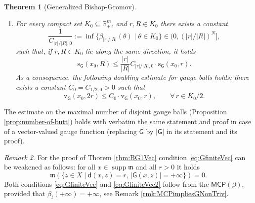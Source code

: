 \documentclass[11pt,a4paper]{article}
\theoremstyle{plain}
\newtheorem{theorem}{Theorem}[section]
\theoremstyle{definition}
\theoremstyle{remark}
\newtheorem{remark}[theorem]{Remark}
\numberwithin{equation}{section}
\newcommand{\R}{\mathbb{R}} %
\DeclareMathOperator{\supp}{\mathrm{supp}}
\newcommand{\MCP}{\mathsf{MCP}}
\newcommand{\sfs}{\mathsf{s}}
\newcommand{\rv}{\mathrm{v}}
\newcommand{\rs}{\mathrm{s}}
\newcommand{\di}{\mathrm{d}}
\newcommand{\mm}{\mathfrak m}
\newcommand{\sfd}{\mathsf d}
\newcommand{\sfG}{\mathsf G}
\begin{document}
\begin{theorem}[Generalized Bishop-Gromov]
\begin{enumerate}[label = (\roman*)]
\begin{align}
\frac{\rs_{\sfG}(x_{0}, r)}{ \rs_{\sfG}(x_{0}, R)} \geq \frac{|R|}{|r|} \frac{\sfs(r)}{ \sfs(R)}. \label{eq:BisGr2VecA} 
\end{align}
Furthermore, it holds:
 \begin{equation} \label{eq:BisGr2VecV}
 \frac{\rv_{\sfG}(x_{0}, r)}{ \int_{0}^{|r|}   \sfs(t\theta)/t \, \di t} \geq \frac{\rv_{\sfG}(x_{0}, R)}{ \int_0^{|R|} \sfs(t\theta)/t \, \di t};
 \end{equation}

\item  \label{i:BG6Vec} For every compact set $K_0\subseteq \R^m_+$, and $r,R\in K_0$ there exists a constant 
\begin{equation}
\frac{1}{C_{|r|/|R|,0}}:=\inf\{\beta_{|r|/|R|}(\theta) \mid \theta\in K_0 \} \in (0,(|r|/|R|)^N],
\end{equation}
such that,  if $r,R \in K_0$ lie along the same direction, it holds
\begin{equation}
 \rs_{\sfG}(x_0,R) \leq \frac{|r|}{|R|} C_{|r|/|R|,0}\cdot \rs_{\sfG}(x_0,r).
\end{equation}
As a consequence, the following doubling estimate for gauge balls holds: there exists a constant $C_0 = C_{1/2,0}>0$ such that
\begin{equation}
\rv_{\sfG}(x_0,2r)\leq C_0 \cdot \rv_{\sfG}(x_0,r), \qquad \forall\, r \in K_0/2.
\end{equation}
\end{enumerate}
\end{theorem}

The estimate on the maximal number of disjoint gauge balls (Proposition \ref{prop:number-of-butt}) holds with verbatim the same statement and proof in case of a vector-valued gauge function (replacing $\sfG$ by $|\sfG|$ in its statement and its proof).

\begin{remark}\label{rem:onCond3.15bis}
For the proof of Thorem \ref{thm:BG1Vec} condition \eqref{eq:GfiniteVec} can be weakened as follows: for all $x\in\supp\mm$  and all $r>0$ it holds
\begin{equation}\label{eq:GfiniteVec2}
\mm(\{z\in X\mid   \sfd(x,z)=r,\, |\sfG(x, z)|=+\infty\})=0.
\end{equation}
Both conditions \eqref{eq:GfiniteVec} and  \eqref{eq:GfiniteVec2} follow from the $\MCP(\beta)$, provided that $\beta_t(+\infty) = +\infty$, see Remark \ref{rmk:MCPimpliesGNonTriv}.
\end{remark}
\end{document}
